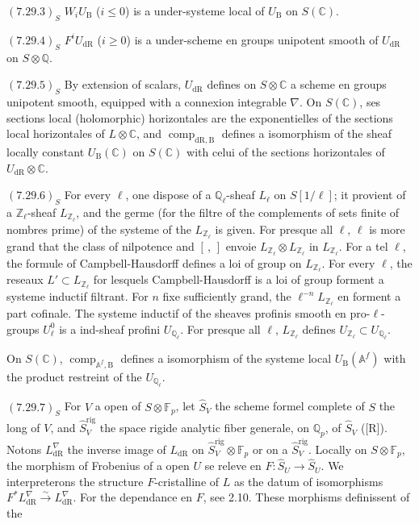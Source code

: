 \documentclass[12pt,a4paper]{article}
\theoremstyle{plain}
\theoremstyle{definition}
\theoremstyle{remark}
\DeclareMathOperator{\comp}{comp}
\newcommand{\rig}{\mathrm{rig}}
\newcommand{\DR}{\mathrm{dR}}
\newcommand{\B}{\mathrm{B}}
\newcommand{\Z}{\mathbb{Z}}
\newcommand{\Q}{\mathbb{Q}}
\newcommand{\C}{\mathbb{C}}
\newcommand{\F}{\mathbb{F}}
\newcommand{\A}{\mathbb{A}}
\begin{document}
$(7.29.3)_S$ $W_iU_\B$ ($i \leq 0$) is a under-systeme local of $U_\B$ on $S(\C)$.

$(7.29.4)_S$ $F^iU_\DR$ ($i \geq 0$) is a under-scheme en groups unipotent smooth of $U_\DR$ on $S \otimes \Q$.

$(7.29.5)_S$ By extension of scalars, $U_\DR$ defines on $S \otimes \C$ a scheme en groups unipotent smooth, equipped with a connexion integrable $\nabla$. On $S(\C)$, ses sections local (holomorphic) horizontales are the exponentielles of the sections local horizontales of $L \otimes \C$, and $\comp_{\DR,\B}$ defines a isomorphism of the sheaf locally constant $U_\B(\C)$ on $S(\C)$ with celui of the sections horizontales of $U_\DR \otimes \C$.

$(7.29.6)_S$ For every $\ell$, one dispose of a $\Q_\ell$-sheaf $L_\ell$ on $S[1/\ell]$; it provient of a $\Z_\ell$-sheaf $L_{\Z_\ell}$, and the germe (for the filtre of the complements of sets finite of nombres prime) of the systeme of the $L_{\Z_\ell}$ is given. For presque all $\ell$, $\ell$ is more grand that the class of nilpotence and $[\,,\,]$ envoie $L_{\Z_\ell} \otimes L_{\Z_\ell}$ in $L_{\Z_\ell}$. For a tel $\ell$, the formule of Campbell-Hausdorff defines a loi of group on $L_{\Z_\ell}$. For every $\ell$, the reseaux $L' \subset L_{\Z_\ell}$ for lesquels Campbell-Hausdorff is a loi of group forment a systeme inductif filtrant. For $n$ fixe sufficiently grand, the $\ell^{-n}L_{\Z_\ell}$ en forment a part cofinale. The systeme inductif of the sheaves profinis smooth en pro-$\ell$-groups $U^0_\ell$ is a ind-sheaf profini $U_{\Q_\ell}$. For presque all $\ell$, $L_{\Z_\ell}$ defines $U_{\Z_\ell} \subset U_{\Q_\ell}$.

On $S(\C)$, $\comp_{\A^f,\B}$ defines a isomorphism of the systeme local $U_\B(\A^f)$ with the product restreint of the $U_{\Q_\ell}$.

$(7.29.7)_S$ For $V$ a open of $S \otimes \F_p$, let $\hat{S}_V$ the scheme formel complete of $S$ the long of $V$, and $\hat{S}^{\rig}_V$ the space rigide analytic fiber generale, on $\Q_p$, of $\hat{S}_V$ ([R]). Notons $L^{\nabla}_\DR$ the inverse image of $L_\DR$ on $\hat{S}^{\rig}_V \otimes \F_p$ or on a $\hat{S}^{\rig}_V$. Locally on $S \otimes \F_p$, the morphism of Frobenius of a open $U$ se releve en $F: \hat{S}_U \to \hat{S}_U$. We interpreterons the structure $F$-cristalline of $L$ as the datum of isomorphisms $F^*L^{\nabla}_\DR \xrightarrow{\sim} L^{\nabla}_\DR$. For the dependance en $F$, see 2.10. These morphisms definissent of the
\end{document}
